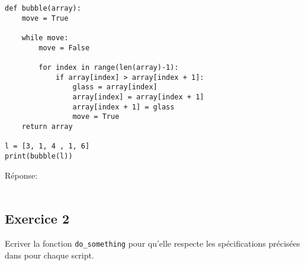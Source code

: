 \documentclass[12pt,a4paper]{article}
\newcommand{\codeintext}[1]{\texttt{#1}}
\newcommand{\response}[0]{Réponse:\hrulefill\\\\}
\begin{document}
\begin{enumerate}
\begin{lstlisting}
def bubble(array):
	move = True
	
	while move:
		move = False
			
		for index in range(len(array)-1):
			if array[index] > array[index + 1]:
				glass = array[index]
				array[index] = array[index + 1]
				array[index + 1] = glass
				move = True
	return array
	
l = [3, 1, 4 , 1, 6]
print(bubble(l))

\end{lstlisting}
\response %
\end{enumerate}
\pagebreak
\subsection*{Exercice 2}

Ecriver la fonction \codeintext{do\_something} pour qu'elle respecte les spécifications précisées dans pour chaque script.
\end{document}
